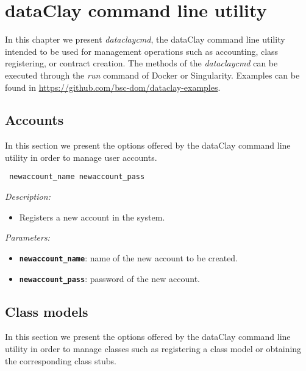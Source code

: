 
\chapter{dataClay command line utility}
\label{sec:dClayTool}

In this chapter we present \textit{dataclaycmd}, the dataClay command line utility intended to be used for management operations such as accounting, class registering, or contract creation. The methods of the \textit{dataclaycmd} can be executed through the \textit{run} command of Docker or Singularity. Examples can be found in \href{https://github.com/bsc-dom/dataclay-examples}{https://github.com/bsc-dom/dataclay-examples}.

\section{Accounts}

In this section we present the options offered by the dataClay command line utility in order to manage user accounts.


\begin{dBox}
\texttt{ newaccount\_name newaccount\_pass}
\LINE

{\it Description:}

\begin{itemize}
    \item Registers a new account in the system.
\end{itemize}

{\it Parameters:}

\begin{itemize}
    \item \texttt{\bfseries newaccount\_name}: name of the new account to be created.
    \item \texttt{\bfseries newaccount\_pass}: password of the new account.
\end{itemize}
 
\end{dBox}

\section{Class models}
\label{sec:newModel}

In this section we present the options offered by the dataClay command line utility in order to manage classes such as registering a class model or obtaining the corresponding class stubs.


